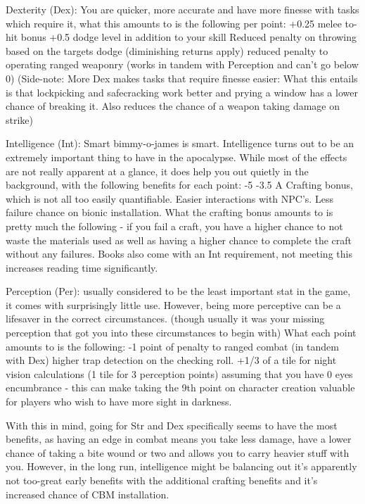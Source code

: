 \documentclass[11pt]{report}
\begin{document}
Dexterity (Dex): You are quicker, more accurate and have more finesse with tasks which require it, what this amounts to is the following per point:
+0.25 melee to-hit bonus
+0.5 dodge level in addition to your skill
Reduced penalty on throwing based on the targets dodge (diminishing returns apply)
reduced penalty to operating ranged weaponry (works in tandem with Perception and can't go below 0)
(Side-note: More Dex makes tasks that require finesse easier: What this entails is that lockpicking and safecracking work better and prying a window has a lower chance of breaking it. Also reduces the chance of a weapon taking damage on strike)

Intelligence (Int): Smart bimmy-o-james is smart. Intelligence turns out to be an extremely important thing to have in the apocalypse. While most of the effects are not really apparent at a glance, it does help you out quietly in the background, with the following benefits for each point:
-5%
-3.5%
A Crafting bonus, which is not all too easily quantifiable.
Easier interactions with NPC's.
Less failure chance on bionic installation.
What the crafting bonus amounts to is pretty much the following - if you fail a craft, you have a higher chance to not waste the materials used as well as having a higher chance to complete the craft without any failures.
Books also come with an Int requirement, not meeting this increases reading time significantly.

Perception (Per): usually considered to be the least important stat in the game, it comes with surprisingly little use. However, being more perceptive can be a lifesaver in the correct circumstances. (though usually it was your missing perception that got you into these circumstances to begin with)
What each point amounts to is the following:
-1 point of penalty to ranged combat (in tandem with Dex)
higher trap detection on the checking roll.
+1/3 of a tile for night vision calculations (1 tile for 3 perception points) assuming that you have 0 eyes encumbrance - this can make taking the 9th point on character creation valuable for players who wish to have more sight in darkness.

With this in mind, going for Str and Dex specifically seems to have the most benefits, as having an edge in combat means you take less damage, have a lower chance of taking a bite wound or two and allows you to carry heavier stuff with you.
However, in the long run, intelligence might be balancing out it's apparently not too-great early benefits with the additional crafting benefits and it's increased chance of CBM installation.
\end{document}
